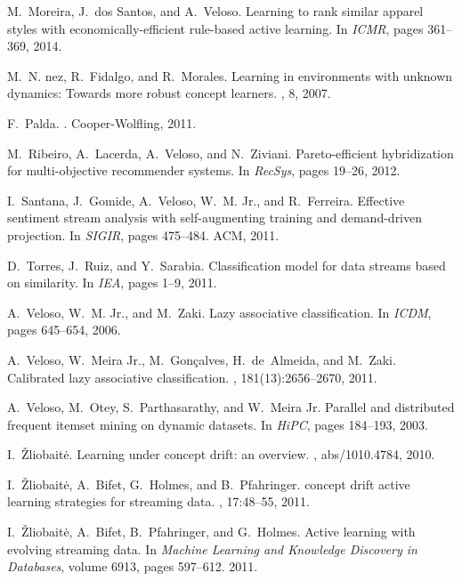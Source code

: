 \documentclass{sig-alternate}
\begin{document}
\begin{thebibliography}{10}
M.~Moreira, J.~dos Santos, and A.~Veloso.
\newblock Learning to rank similar apparel styles with economically-efficient
  rule-based active learning.
\newblock In {\em ICMR}, pages 361--369, 2014.

M.~N. {n}ez, R.~Fidalgo, and R.~Morales.
\newblock Learning in environments with unknown dynamics: Towards more robust
  concept learners.
, 8, 2007.

F.~Palda.
.
\newblock Cooper-Wolfling, 2011.

M.~Ribeiro, A.~Lacerda, A.~Veloso, and N.~Ziviani.
\newblock Pareto-efficient hybridization for multi-objective recommender
  systems.
\newblock In {\em RecSys}, pages 19--26, 2012.

I.~Santana, J.~Gomide, A.~Veloso, W.~M. {Jr.}, and R.~Ferreira.
\newblock Effective sentiment stream analysis with self-augmenting training and
  demand-driven projection.
\newblock In {\em SIGIR}, pages 475--484. ACM, 2011.

D.~Torres, J.~Ruiz, and Y.~Sarabia.
\newblock Classification model for data streams based on similarity.
\newblock In {\em IEA}, pages 1--9, 2011.

A.~Veloso, W.~M. Jr., and M.~Zaki.
\newblock Lazy associative classification.
\newblock In {\em ICDM}, pages 645--654, 2006.

A.~Veloso, W.~{Meira Jr.}, M.~Gon\c{c}alves, H.~de~Almeida, and M.~Zaki.
\newblock Calibrated lazy associative classification.
, 181(13):2656--2670, 2011.

A.~Veloso, M.~Otey, S.~Parthasarathy, and W.~{Meira Jr.}
\newblock Parallel and distributed frequent itemset mining on dynamic datasets.
\newblock In {\em HiPC}, pages 184--193, 2003.

I.~\v{Z}liobait\.{e}.
\newblock Learning under concept drift: an overview.
, abs/1010.4784, 2010.

I.~\v{Z}liobait\.{e}, A.~Bifet, G.~Holmes, and B.~Pfahringer.
 concept drift active learning strategies for streaming data.
, 17:48--55, 2011.

I.~\v{Z}liobait\.{e}, A.~Bifet, B.~Pfahringer, and G.~Holmes.
\newblock Active learning with evolving streaming data.
\newblock In {\em Machine Learning and Knowledge Discovery in Databases},
  volume 6913, pages 597--612. 2011.


\end{thebibliography}
\end{document}
